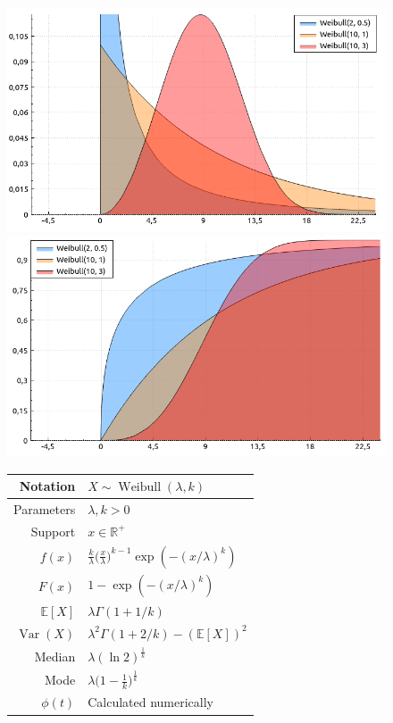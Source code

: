 \documentclass[a4paper,11pt]{article}
\theoremstyle{plain}
\theoremstyle{definition}
\newcommand{\ME}{\mathbb{E}}
\newcommand{\MR}{\mathbb{R}}
\newcommand{\Var}{\operatorname{Var}}
\begin{document}
\begin{figure}[!htb]\centering
	\begin{minipage}{0.55\textwidth}
		\includegraphics[width=\linewidth, right]{weibull_pdf}
		\captionsetup{labelformat=empty}
		\includegraphics[width=\linewidth, right]{weibull_cdf}
		\captionsetup{labelformat=empty}
	\end{minipage}
	\begin{minipage}{0.4\textwidth}
		\begin{tabular}{| r | l |}
			\hline
			Notation & $X \sim \operatorname{Weibull}(\lambda, k)$ \\
			\hline
			Parameters & $\lambda, k > 0 $ \\
			\hline
			Support & $x \in \MR^+$  \\
			\hline
			$f(x)$ & $ \frac{k}{\lambda}\big( \frac{x}{\lambda}\big)^{k-1} \exp(-(x/\lambda)^k)  $ \\
			\hline
			$F(x)$ & $ 1-\exp(-(x/\lambda)^k) $ \\
			\hline
			$\ME[X]$ & $ \lambda \Gamma(1+1/k)$ \\
			\hline
			$\Var(X)$ & $\lambda^2 \Gamma(1+2/k) - (\ME[X])^2$ \\
			\hline
			Median & $\lambda (\ln2)^{\frac{1}{k}}$ \\
			\hline
			Mode & $\lambda \big( 1-\frac{1}{k} \big)^{\frac{1}{k}}$ \\
			\hline
			$\phi(t)$ & Calculated numerically \\
			\hline
		\end{tabular}
	\end{minipage}
\end{figure}
\end{document}
